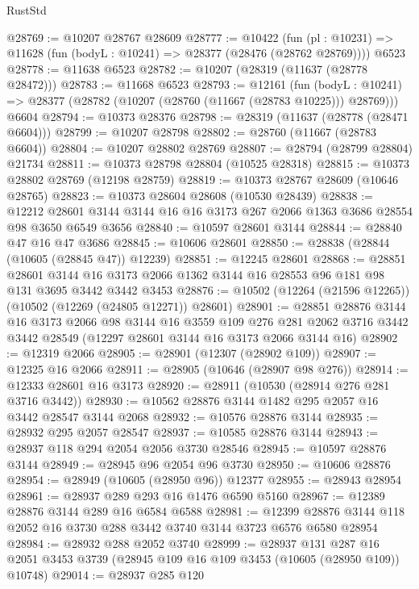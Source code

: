 \begin{lexlean}{RustStd}
\begin{coremodule}
@28769 := @10207 @28767 @28609
@28777 := @10422
    (fun (pl : @10231) => @11628 (fun (bodyL : @10241) => @28377 (@28476 (@28762 @28769))))
    @6523
@28778 := @11638 @6523
@28782 := @10207 (@28319 (@11637 (@28778 @28472)))
@28783 := @11668 @6523
@28793 := @12161
    (fun (bodyL : @10241) => @28377 (@28782 (@10207 (@28760 (@11667 (@28783 @10225))) @28769)))
    @6604
@28794 := @10373 @28376
@28798 := @28319 (@11637 (@28778 (@28471 @6604)))
@28799 := @10207 @28798
@28802 := @28760 (@11667 (@28783 @6604))
@28804 := @10207 @28802 @28769
@28807 := @28794 (@28799 @28804) @21734
@28811 := @10373 @28798 @28804 (@10525 @28318)
@28815 := @10373 @28802 @28769 (@12198 @28759)
@28819 := @10373 @28767 @28609 (@10646 @28765)
@28823 := @10373 @28604 @28608 (@10530 @28439)
@28838 := @12212
    @28601
    @3144
    @3144
    @16
    @16
    @3173
    @267
    @2066
    @1363
    @3686
    @28554
    @98
    @3650
    @6549
    @3656
@28840 := @10597 @28601 @3144
@28844 := @28840 @47 @16 @47 @3686
@28845 := @10606 @28601
@28850 := @28838 (@28844 (@10605 (@28845 @47)) @12239)
@28851 := @12245 @28601
@28868 := @28851
    @28601
    @3144
    @16
    @3173
    @2066
    @1362
    @3144
    @16
    @28553
    @96
    @181
    @98
    @131
    @3695
    @3442
    @3442
    @3453
@28876 := @10502 (@12264 (@21596 @12265)) (@10502 (@12269 (@24805 @12271)) @28601)
@28901 := @28851
    @28876
    @3144
    @16
    @3173
    @2066
    @98
    @3144
    @16
    @3559
    @109
    @276
    @281
    @2062
    @3716
    @3442
    @3442
    @28549
    (@12297 @28601 @3144 @16 @3173 @2066 @3144 @16)
@28902 := @12319 @2066
@28905 := @28901 (@12307 (@28902 @109))
@28907 := @12325 @16 @2066
@28911 := @28905 (@10646 (@28907 @98 @276))
@28914 := @12333 @28601 @16 @3173
@28920 := @28911 (@10530 (@28914 @276 @281 @3716 @3442))
@28930 := @10562 @28876 @3144 @1482 @295 @2057 @16 @3442 @28547 @3144 @2068
@28932 := @10576 @28876 @3144
@28935 := @28932 @295 @2057 @28547
@28937 := @10585 @28876 @3144
@28943 := @28937 @118 @294 @2054 @2056 @3730 @28546
@28945 := @10597 @28876 @3144
@28949 := @28945 @96 @2054 @96 @3730
@28950 := @10606 @28876
@28954 := @28949 (@10605 (@28950 @96)) @12377
@28955 := @28943 @28954
@28961 := @28937 @289 @293 @16 @1476 @6590 @5160
@28967 := @12389 @28876 @3144 @289 @16 @6584 @6588
@28981 := @12399 @28876 @3144 @118 @2052 @16 @3730 @288 @3442 @3740 @3144 @3723 @6576 @6580 @28954
@28984 := @28932 @288 @2052 @3740
@28999 := @28937
    @131
    @287
    @16
    @2051
    @3453
    @3739
    (@28945 @109 @16 @109 @3453 (@10605 (@28950 @109)) @10748)
@29014 := @28937
    @285
    @120

\end{coremodule}
\end{lexlean}
